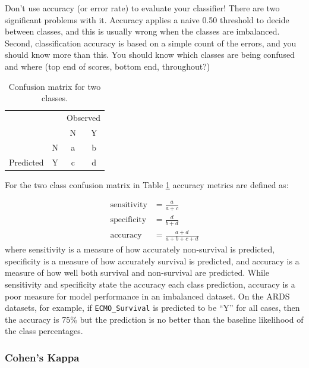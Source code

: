 \documentclass[12pt,]{article}
\begin{document}
Don't use accuracy (or error rate) to evaluate your classifier! There
are two significant problems with it. Accuracy applies a naive 0.50
threshold to decide between classes, and this is usually wrong when the
classes are imbalanced. Second, classification accuracy is based on a
simple count of the errors, and you should know more than this. You
should know which classes are being confused and where (top end of
scores, bottom end, throughout?)

\begin{table}[!h]

\caption{\label{tab:confusion-matrix}\label{tab:confusion-matrix} Confusion matrix for two classes.}
\centering
\fontsize{12}{14}\selectfont
\begin{tabular}{lc|cc}
\toprule
\multicolumn{2}{c}{ } & \multicolumn{2}{c}{Observed} \\
\cmidrule(l{3pt}r{3pt}){3-4}
  &   & N & Y\\
\midrule
\rowcolor{gray!6}   & N & a & b\\

\multirow{-2}{*}{\raggedright\arraybackslash Predicted} & Y & c & d\\
\bottomrule
\end{tabular}
\end{table}

For the two class confusion matrix in Table \ref{tab:confusion-matrix}
accuracy metrics are defined as:

\[
\begin{aligned}
\text{sensitivity} &= \frac{a}{a+c} \\
\text{specificity} &= \frac{d}{b+d} \\
\text{accuracy} &= \frac{a+d}{a+b+c+d}
\end{aligned}
\] where sensitivity is a measure of how accurately non-survival is
predicted, specificity is a measure of how accurately survival is
predicted, and accuracy is a measure of how well both survival and
non-survival are predicted. While sensitivity and specificity state the
accuracy each class prediction, accuracy is a poor measure for model
performance in an imbalanced dataset. On the ARDS datasets, for example,
if \texttt{ECMO\_Survival} is predicted to be ``Y'' for all cases, then
the accuracy is 75\% but the prediction is no better than the baseline
likelihood of the class percentages.

\subsubsection{Cohen's Kappa}\label{cohens-kappa}
\end{document}
